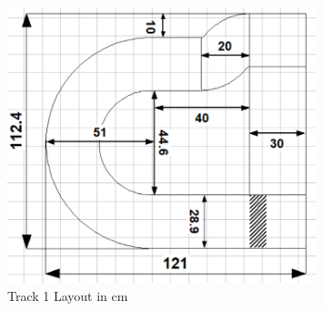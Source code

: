 \begin{figure}[H]
    \label{Track1Layout}
    \centering
    \includegraphics[width=0.8\textwidth]{Images/Tracks/Track1.PNG}
    \caption{Track 1 Layout in cm}
\end{figure}








